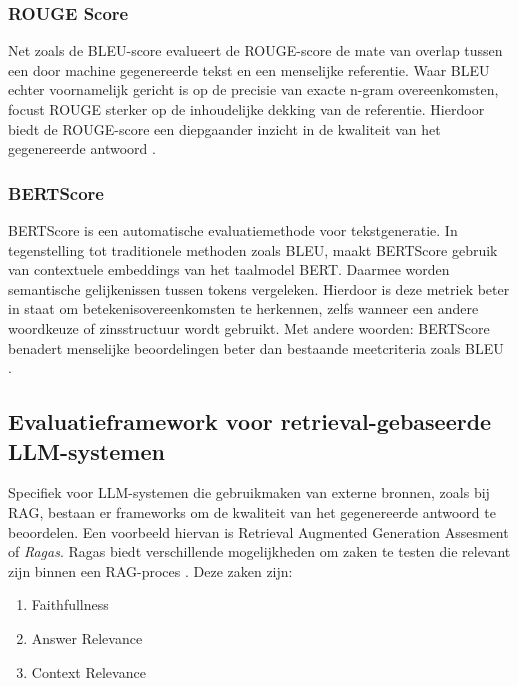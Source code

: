 \subsubsection{ROUGE Score}

Net zoals de BLEU-score evalueert de ROUGE-score de mate van overlap tussen een door machine gegenereerde tekst en een menselijke referentie. Waar BLEU echter voornamelijk gericht is op de precisie van exacte n-gram overeenkomsten, focust ROUGE sterker op de inhoudelijke dekking van de referentie. Hierdoor biedt de ROUGE-score een diepgaander inzicht in de kwaliteit van het gegenereerde antwoord \autocite{ganesan2018rouge20updatedimproved}.

\subsubsection{BERTScore}

BERTScore is een automatische evaluatiemethode voor tekstgeneratie. In tegenstelling tot traditionele methoden zoals BLEU, maakt BERTScore gebruik van contextuele embeddings van het taalmodel BERT. Daarmee worden semantische gelijkenissen tussen tokens vergeleken. Hierdoor is deze metriek beter in staat om betekenisovereenkomsten te herkennen, zelfs wanneer een andere woordkeuze of zinsstructuur wordt gebruikt. Met andere woorden: BERTScore benadert menselijke beoordelingen beter dan bestaande meetcriteria zoals BLEU \autocite{Zhang2019}.

\subsection{Evaluatieframework voor retrieval-gebaseerde LLM-systemen}

Specifiek voor LLM-systemen die gebruikmaken van externe bronnen, zoals bij RAG, bestaan er frameworks om de kwaliteit van het gegenereerde antwoord te beoordelen. Een voorbeeld hiervan is Retrieval Augmented Generation Assesment of \textit{Ragas}. Ragas biedt verschillende mogelijkheden om zaken te testen die relevant zijn binnen een RAG-proces \autocite{Es2023}. Deze zaken zijn:
\begin{enumerate}
    \item Faithfullness
    \item Answer Relevance
    \item Context Relevance
\end{enumerate}

